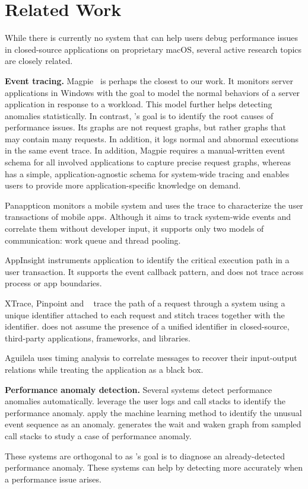 \section{Related Work}
\label{sec:related-work}

While there is currently no system that can help users debug performance
issues in closed-source applications on proprietary macOS, several active
research topics are closely related.

\textbf{Event tracing.}  Magpie~\cite{barham2004using} is perhaps the closest to
our work.  It monitors server applications in Windows with the goal to model
the normal behaviors of a server application in response to a workload.  This
model further helps detecting anomalies statistically.  In contrast, \xxx's
goal is to identify the root causes of performance issues.  Its graphs are not
request graphs, but rather graphs that may contain many requests.  In addition,
it logs normal and abnormal executions in the same event trace.  In addition,
Magpie requires a manual-written event schema for all involved applications to
capture precise request graphs, whereas \xxx has a simple, application-agnostic
schema for system-wide tracing and enables users to provide more
application-specific knowledge on demand.

Panappticon \cite{zhang2013panappticon} monitors a mobile system and uses the
trace to characterize the user transactions of mobile apps.  Although it
aims to track system-wide events and correlate them without developer
input, it supports only two models of communication: work queue and thread
pooling.

AppInsight \cite{ravindranath2012appinsight} instruments application to
identify the critical execution path in a user transaction.  It supports the
event callback pattern, and does not trace across process or app boundaries.

XTrace, Pinpoint and \etc ~\cite{fonseca2007x, chen2002pinpoint,
chow2014mystery} trace the path of a request through a system using a unique
identifier attached to each request and stitch traces together with the
identifier.  \xxx does not assume the presence of a unified identifier in
closed-source, third-party applications, frameworks, and libraries.

Aguilela \cite{aguilera2003performance} uses timing analysis to correlate
messages to recover their input-output relations while treating the application
as a black box.

\textbf{Performance anomaly detection.}  Several systems detect performance
anomalies automatically.  \cite{han2012performance, yuan2012conservative}
leverage the user logs and call stacks to identify the performance anomaly.
\cite{cohen2004correlating, saidi2008full, xu2009detecting, du2017deeplog} apply
the machine learning method to identify the unusual event sequence as an
anomaly.  \cite{yu2014comprehending} generates the wait and waken graph from
sampled call stacks to study a case of performance anomaly.

These systems are orthogonal to \xxx as \xxx's goal is to diagnose an
already-detected performance anomaly.  These systems can help \xxx by detecting
more accurately when a performance issue arises.
